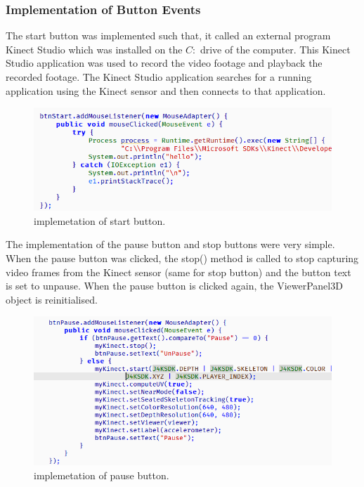 \documentclass[a4paper, 12pt]{article}
\begin{document}
\subsubsection{Implementation of Button Events}

The start button was implemented such that, it called an external program Kinect Studio which was installed on the $C:$ drive of the computer. This Kinect Studio application was used to record the video footage and playback the recorded footage. The Kinect Studio application searches for a running application using the Kinect sensor and then connects to that application. 

\begin{figure}[!htb]
	\begin{center}
  \includegraphics[scale=0.7]{codesnippet14.png}
  	\caption{implemetation of start button.}
  \end{center} 
  \label{fig: codesnippet13} 
\end{figure}

The implementation of the pause button and stop buttons were very simple. When the pause button was clicked, the stop() method is called to stop capturing video frames from the Kinect sensor (same for stop button) and the button text is set to unpause. When the pause button is clicked again, the ViewerPanel3D object is reinitialised. 

\begin{figure}[!htb]
	\begin{center}
  \includegraphics[scale=0.7]{codesnippet15.png}
  	\caption{implemetation of pause button.}
  \end{center} 
  \label{fig: codesnippet14} 
\end{figure}
\end{document}
